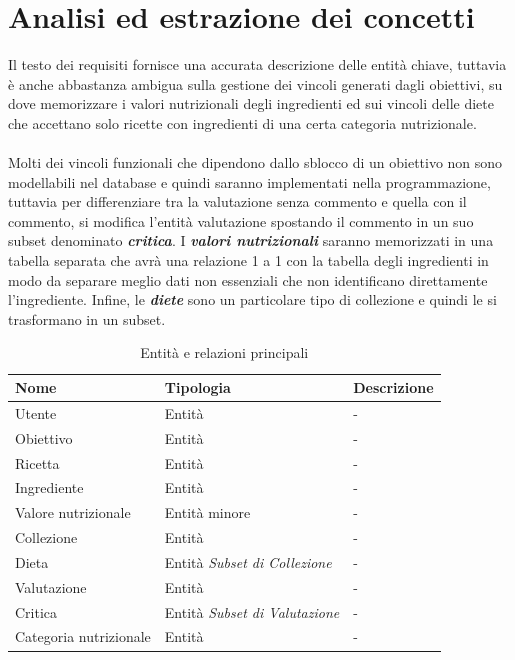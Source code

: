 ﻿\documentclass[a4paper,12pt]{report}
\begin{document}
\section{Analisi ed estrazione dei concetti}
Il testo dei requisiti fornisce una accurata descrizione delle entità chiave, tuttavia è anche abbastanza ambigua sulla gestione dei vincoli generati dagli obiettivi, su dove memorizzare i valori nutrizionali degli ingredienti ed sui vincoli delle diete che accettano solo ricette con ingredienti di una certa categoria nutrizionale.
\\\\
Molti dei vincoli funzionali che dipendono dallo sblocco di un obiettivo non sono modellabili nel database e quindi saranno implementati nella programmazione, tuttavia per differenziare tra la valutazione senza commento e quella con il commento, si modifica l'entità valutazione spostando il commento in un suo subset denominato \textbf{\textit{critica}}.
I \textbf{\textit{valori nutrizionali}} saranno memorizzati in una tabella separata che avrà una relazione 1 a 1 con la tabella degli ingredienti in modo da separare meglio dati non essenziali che non identificano direttamente l'ingrediente. Infine, le \textbf{\textit{diete}} sono un particolare tipo di collezione e quindi le si trasformano in un subset.
\begin{table}[h!]
    \centering
    \begin{tabular}{ |p{1.2in}|p{1.2in}|p{2.4in}| }
        \hline
        \scriptsize{\textbf{Nome}} & \scriptsize{\textbf{Tipologia}} & \scriptsize{\textbf{Descrizione}} \\
        \hline
        \scriptsize{Utente} & \scriptsize{Entità} & \scriptsize{-} \\
        \hline
        \scriptsize{Obiettivo} & \scriptsize{Entità} & \scriptsize{-} \\
        \hline
        \scriptsize{Ricetta} & \scriptsize{Entità} & \scriptsize{-} \\
        \hline
        \scriptsize{Ingrediente} & \scriptsize{Entità} & \scriptsize{-} \\
        \hline
        \scriptsize{Valore nutrizionale} & \scriptsize{Entità minore} & \scriptsize{-} \\
        \hline
        \scriptsize{Collezione} & \scriptsize{Entità} & \scriptsize{-} \\
        \hline
        \scriptsize{Dieta} & \scriptsize{Entità \newline \textit{Subset di Collezione}} & \scriptsize{-} \\
        \hline
        \scriptsize{Valutazione} & \scriptsize{Entità} & \scriptsize{-} \\
        \hline
        \scriptsize{Critica} & \scriptsize{Entità \newline \textit{Subset di Valutazione}} & \scriptsize{-} \\
        \hline
        \scriptsize{Categoria nutrizionale} & \scriptsize{Entità} & \scriptsize{-} \\
        \hline
    \end{tabular}
    \caption{Entità e relazioni principali}
\end{table}
\end{document}
